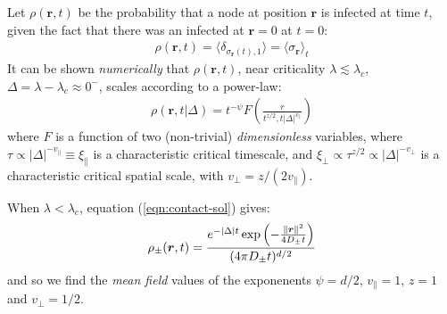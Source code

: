 \documentclass[../../main.tex]{subfiles}
\begin{document}
Let $\rho(\bm{r},t)$ be the probability that a node at position $\bm{r}$ is infected at time $t$, given the fact that there was an infected at $\bm{r}=0$ at $t=0$:
\begin{align*}
    \rho(\bm{r},t) = \langle \delta_{\sigma_{\bm{r}}(t),1} \rangle = \langle \sigma_{\bm{r}} \rangle_t
\end{align*}
It can be shown \textit{numerically} that $\rho(\bm{r},t)$, near criticality $\lambda \lesssim \lambda_c$, $\Delta = \lambda - \lambda_c \approx 0^-$, scales according to a power-law:
\begin{align*}
    \rho(\bm{r},t|\Delta) = t^{-\psi} F\left(\frac{r}{t^{z/2}, t |\Delta|^{v_\parallel}} \right)
\end{align*}  
where $F$ is a function of two (non-trivial) \textit{dimensionless} variables, where $\tau \propto |\Delta|^{-v_\parallel} \equiv \xi_\parallel$ is a characteristic critical timescale, and $\xi_\perp \propto \tau^{z/2} \propto |\Delta|^{-v_\perp}$ is a characteristic critical spatial scale, with $v_\perp = z/(2 v_\parallel)$. %

\medskip

When $\lambda < \lambda_c$, equation (\ref{eqn:contact-sol}) gives:
\begin{align}
    \rho_{\pm}(\bm{r},t) = \frac{e^{-|\Delta|t} \exp\left(-\frac{\norm{\bm{r}}^2}{4 D_{\pm} t} \right)}{(4 \pi D_{\pm} t)^{d/2}} 
\end{align}
and so we find the \textit{mean field} values of the exponenents $\psi = d/2$, $v_\parallel = 1$, $z=1$ and $v_\perp = 1/2$.
\end{document}
